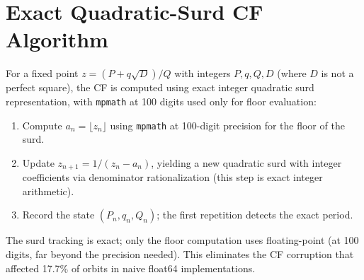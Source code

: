\documentclass[11pt]{article}
\theoremstyle{definition}
\begin{document}
\section{Exact Quadratic-Surd CF Algorithm}\label{app:surd}

For a fixed point $z = (P + q\sqrt{D})/Q$ with integers
$P, q, Q, D$ (where $D$ is not a perfect square), the CF is
computed using exact integer quadratic surd representation, with
\texttt{mpmath} at 100 digits used only for floor evaluation:
\begin{enumerate}
\item Compute $a_n = \lfloor z_n \rfloor$ using \texttt{mpmath}
  at 100-digit precision for the floor of the surd.
\item Update $z_{n+1} = 1/(z_n - a_n)$, yielding a new quadratic
  surd with integer coefficients via denominator rationalization
  (this step is exact integer arithmetic).
\item Record the state $(P_n, q_n, Q_n)$; the first repetition
  detects the exact period.
\end{enumerate}
The surd tracking is exact; only the floor computation uses
floating-point (at 100 digits, far beyond the precision needed).
This eliminates the CF corruption that affected 17.7\% of orbits
in naive float64 implementations.
\end{document}
